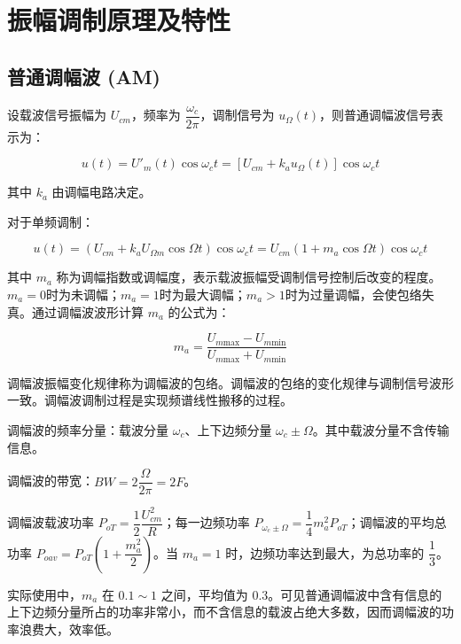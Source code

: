 \section{振幅调制原理及特性}

\subsection{普通调幅波 (AM)}

设载波信号振幅为 $U_{cm}$，频率为 $\dfrac{\omega_c}{2 \pi}$，调制信号为 $u_{\Omega}(t)$，则普通调幅波信号表示为：

\begin{equation}
    u(t) = U'_m(t) \cos{\omega_c t} = \left[ U_{cm} + k_a u_{\Omega}(t) \right] \cos{\omega_c t}
\end{equation}

其中 $k_a$ 由调幅电路决定。

对于单频调制：

\begin{equation}
    u(t) = \left( U_{cm} + k_a U_{\Omega m} \cos{\Omega t} \right) \cos{\omega_c t}
    = U_{cm} \left( 1 + m_a \cos{\Omega t} \right) \cos{\omega_c t}
\end{equation}

其中 $m_a$ 称为调幅指数或调幅度，表示载波振幅受调制信号控制后改变的程度。$m_a = 0$时为未调幅；$m_a = 1$时为最大调幅；$m_a > 1$时为过量调幅，会使包络失真。通过调幅波波形计算 $m_a$ 的公式为：

\begin{equation}
    m_a = \frac{U_{m \text{max}} - U_{m \text{min}}}{U_{m \text{max}} + U_{m \text{min}}}
\end{equation}

调幅波振幅变化规律称为调幅波的包络。调幅波的包络的变化规律与调制信号波形一致。调幅波调制过程是实现频谱线性搬移的过程。

调幅波的频率分量：载波分量 $\omega_c$、上下边频分量 $\omega_c \pm \Omega$。其中载波分量不含传输信息。

调幅波的带宽：$BW = 2 \dfrac{\Omega}{2 \pi} = 2F$。

调幅波载波功率 $P_{oT} = \dfrac{1}{2} \dfrac{U_{cm}^2}{R}$；每一边频功率 $P_{\omega_c \pm \Omega} = \dfrac{1}{4} m_a^2 P_{oT}$；调幅波的平均总功率 $P_{oav} = P_{oT} \left( 1 + \dfrac{m_a^2}{2} \right)$。当 $m_a = 1$ 时，边频功率达到最大，为总功率的 $\dfrac{1}{3}$。

实际使用中，$m_a$ 在 $0.1 \sim 1$ 之间，平均值为 $0.3$。可见普通调幅波中含有信息的上下边频分量所占的功率非常小，而不含信息的载波占绝大多数，因而调幅波的功率浪费大，效率低。

